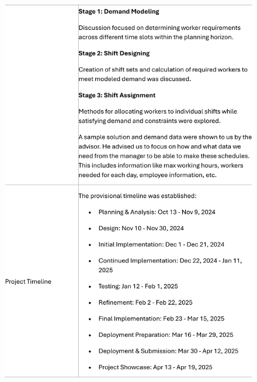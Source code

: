 \documentclass[a4paper,12pt, oneside]{report}
\begin{document}
\begin{appendices}
\begin{figure}[H]
    \includegraphics[width=\textwidth]{Minutes/Minutes_1-cropped-2.png}
\end{figure}
\newpage
\begin{figure}[H]
    \centering

\end{figure}
\end{appendices}
\end{document}
